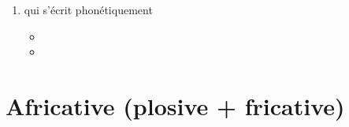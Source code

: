 \begin{enumerate}
\item {} qui s'écrit phonétiquement \href{https://en.oxforddictionaries.com/definition/whole}{}

  \begin{itemize}
  \item{}
  \item{}
  \end{itemize}


\end{enumerate}

\section{Africative (plosive + fricative)}\label{sec:africative}


\subsection{ }\label{subsec:tss}

